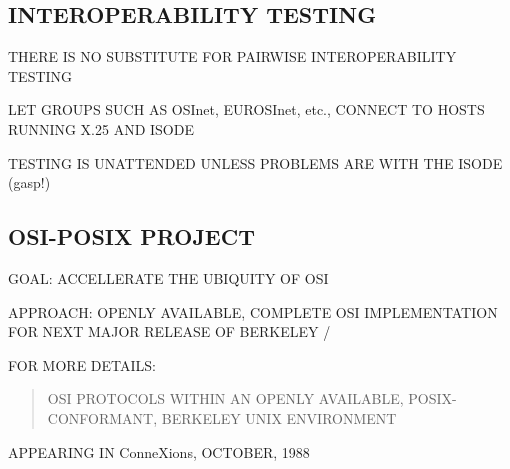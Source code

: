 \begin{bwslide}
\part*	{INTEROPERABILITY TESTING}\bf

\begin{nrtc}
\item	THERE IS NO SUBSTITUTE FOR PAIRWISE INTEROPERABILITY TESTING

\item	LET GROUPS SUCH AS OSInet, EUROSInet, etc., CONNECT TO HOSTS
	RUNNING X.25 AND ISODE

\item	TESTING IS UNATTENDED UNLESS PROBLEMS ARE WITH THE ISODE (gasp!)
\end{nrtc}
\end{bwslide}


\begin{bwslide}
\part*	{OSI-POSIX PROJECT}\bf

\begin{nrtc}
\item	GOAL: ACCELLERATE THE UBIQUITY OF OSI

\item	APPROACH: OPENLY AVAILABLE, COMPLETE OSI IMPLEMENTATION FOR NEXT MAJOR
	RELEASE OF BERKELEY \unix/

\item	FOR MORE DETAILS:
\begin{quote}
OSI PROTOCOLS WITHIN AN OPENLY AVAILABLE, POSIX-CONFORMANT, BERKELEY UNIX
ENVIRONMENT
\end{quote}
APPEARING IN ConneXions, OCTOBER, 1988
\end{nrtc}
\end{bwslide}


\begin{bwslide}
\end{bwslide}


\begin{bwslide}
\end{bwslide}



